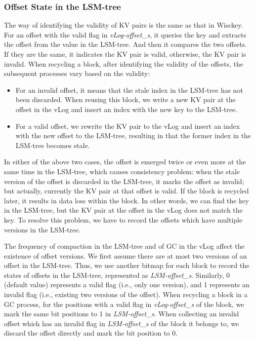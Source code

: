 \documentclass[sigconf]{acmart}
\begin{document}
\subsubsection{Offset State in the LSM-tree}
The way of identifying the validity of KV pairs is the same as that in Wisckey. For an offset with the valid flag in \textit{vLog-offset\_s}, it queries the key and extracts the offset from the value in the LSM-tree. And then it compares the two offsets. If they are the same, it indicates the KV pair is valid, otherwise, the KV pair is invalid. When recycling a block, after identifying the validity of the offsets, the subsequent processes vary based on the validity:
\begin{itemize}
	\item For an invalid offset, it means that the stale index in the LSM-tree has not been discarded. When reusing this block, we write a new KV pair at the offset in the vLog and insert an index with the new key to the LSM-tree. 
	\item For a valid offset, we rewrite the KV pair to the vLog and insert an index with the new offset to the LSM-tree, resulting in that the former index in the LSM-tree becomes stale. 
\end{itemize}

In either of the above two cases, the offset is emerged twice or even more at the same time in the LSM-tree, which causes consistency problem: when the stale version of the offset is discarded in the LSM-tree, it marks the offset as invalid; but actually, currently the KV pair at that offset is valid. If the block is recycled later, it results in data loss within the block. In other words, we can find the key in the LSM-tree, but the KV pair at the offset in the vLog does not match the key. To resolve this problem, we have to record the offsets which have multiple versions in the LSM-tree.

The frequency of compaction in the LSM-tree and of GC in the vLog affect the existence of offset versions. We first assume there are at most two versions of an offset in the LSM-tree. Thus, we use another bitmap for each block to record the states of offsets in the LSM-tree, represented as \textit{LSM-offset\_s}. Similarly, 0 (default value) represents a valid flag (i.e., only one version), and 1 represents an invalid flag (i.e., existing two versions of the offset). When recycling a block in a GC process, for the positions with a valid flag in \textit{vLog-offset\_s} of the block, we mark the same bit positions to 1 in \textit{LSM-offset\_s}. When collecting an invalid offset which has an invalid flag in \textit{LSM-offset\_s} of the block it belongs to, we discard the offset directly and mark the bit position to 0.
\end{document}
